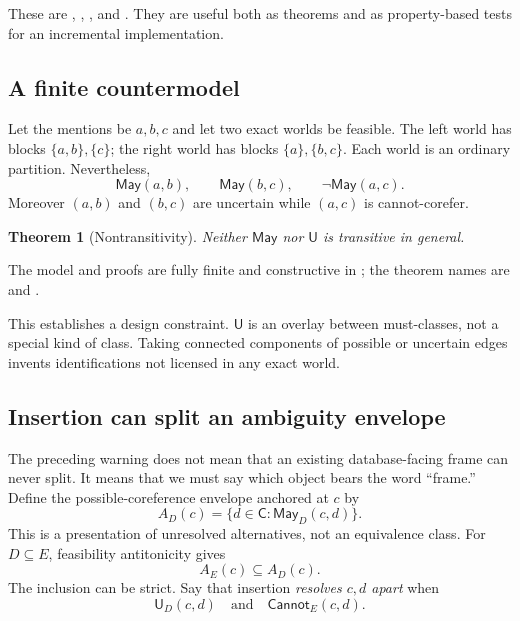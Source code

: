 \documentclass[11pt]{article}
\newtheorem{theorem}{Theorem}[section]
\theoremstyle{definition}
\theoremstyle{remark}
\newcommand{\Claims}{\mathsf C}
\newcommand{\May}{\mathsf{May}}
\newcommand{\Cannot}{\mathsf{Cannot}}
\newcommand{\Uncertain}{\mathsf U}
\begin{document}
These are , ,
, and .  They are useful
both as theorems and as property-based tests for an incremental implementation.

\subsection{A finite countermodel}

Let the mentions be $a,b,c$ and let two exact worlds be feasible.  The left
world has blocks $\{a,b\},\{c\}$; the right world has blocks
$\{a\},\{b,c\}$.  Each world is an ordinary partition.  Nevertheless,
\[
  \May(a,b),\qquad \May(b,c),\qquad \neg\May(a,c).
\]
Moreover $(a,b)$ and $(b,c)$ are uncertain while $(a,c)$ is cannot-corefer.

\begin{theorem}[Nontransitivity]
Neither $\May$ nor $\Uncertain$ is transitive in general.
\end{theorem}
\noindent The model and proofs are fully finite and constructive in
; the theorem names are
 and
.

This establishes a design constraint.  $\Uncertain$ is an overlay between
must-classes, not a special kind of class.  Taking connected components of
possible or uncertain edges invents identifications not licensed in any exact
world.

\subsection{Insertion can split an ambiguity envelope}

The preceding warning does not mean that an existing database-facing frame
can never split.  It means that we must say which object bears the word
``frame.''  Define the possible-coreference envelope anchored at $c$ by
\[
  A_D(c)=\{d\in\Claims:\May_D(c,d)\}.
\]
This is a presentation of unresolved alternatives, not an equivalence class.
For $D\subseteq E$, feasibility antitonicity gives
\[
  A_E(c)\subseteq A_D(c).
\]
The inclusion can be strict.  Say that insertion \emph{resolves $c,d$ apart}
when
\[
  \Uncertain_D(c,d)\quad\text{and}\quad\Cannot_E(c,d).
\]
\end{document}

